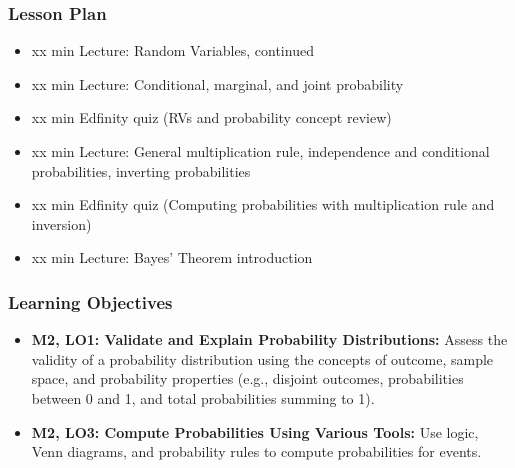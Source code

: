 \begin{frame}
    \frametitle{Lesson Plan}
    \begin{itemize}
        \item xx min Lecture: Random Variables, continued
        \item xx min Lecture: Conditional, marginal, and joint probability
        \item xx min Edfinity quiz (RVs and probability concept review)
        \item xx min Lecture: General multiplication rule, independence and conditional probabilities, inverting probabilities
        \item xx min Edfinity quiz (Computing probabilities with multiplication rule and inversion)
        \item xx min Lecture: Bayes' Theorem introduction
    \end{itemize}
\end{frame}

\begin{frame}
    \frametitle{Learning Objectives}
    \begin{itemize}
        \item \textbf{M2, LO1: Validate and Explain Probability Distributions:} Assess the validity of a probability distribution using the concepts of outcome, sample space, and probability properties (e.g., disjoint outcomes, probabilities between 0 and 1, and total probabilities summing to 1).
        \item \textbf{M2, LO3: Compute Probabilities Using Various Tools:} Use logic, Venn diagrams, and probability rules to compute probabilities for events.
    \end{itemize}
\end{frame}


